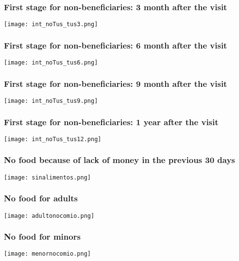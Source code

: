 \documentclass{beamer}
\begin{document}
\begin{frame}
\frametitle{First stage for non-beneficiaries: 3 month after the visit}
\begin{center}
	\texttt{[image: int\_noTus\_tus3.png]}
	\label{int_noTus_tus3}
\end{center}
\end{frame}

\begin{frame}
\frametitle{First stage for non-beneficiaries: 6 month after the visit}
\begin{center}
\texttt{[image: int\_noTus\_tus6.png]}
\label{int_noTus_tus6}
\end{center}
\end{frame}

\begin{frame}
\frametitle{First stage for non-beneficiaries: 9 month after the visit}
\begin{center}
\texttt{[image: int\_noTus\_tus9.png]}
\label{int_noTus_tus9}
\end{center}
\end{frame}

\begin{frame}
\frametitle{First stage for non-beneficiaries: 1 year after the visit}
\begin{center}
\texttt{[image: int\_noTus\_tus12.png]}
\label{int_noTus_tus12}
\end{center}
\end{frame}

\begin{frame}
\frametitle{No food because of lack of money in the previous 30 days}
\begin{center}
	\texttt{[image: sinalimentos.png]}
	\label{sinalimentos}
\end{center}
\end{frame}

\begin{frame}
\frametitle{No food for adults}
\begin{center}
\texttt{[image: adultonocomio.png]}
\label{adultonocomio}
\end{center}
\end{frame}

\begin{frame}
\frametitle{No food for minors}
\begin{center}
\texttt{[image: menornocomio.png]}
\label{menornocomio}
\end{center}
\end{frame}
\end{document}
